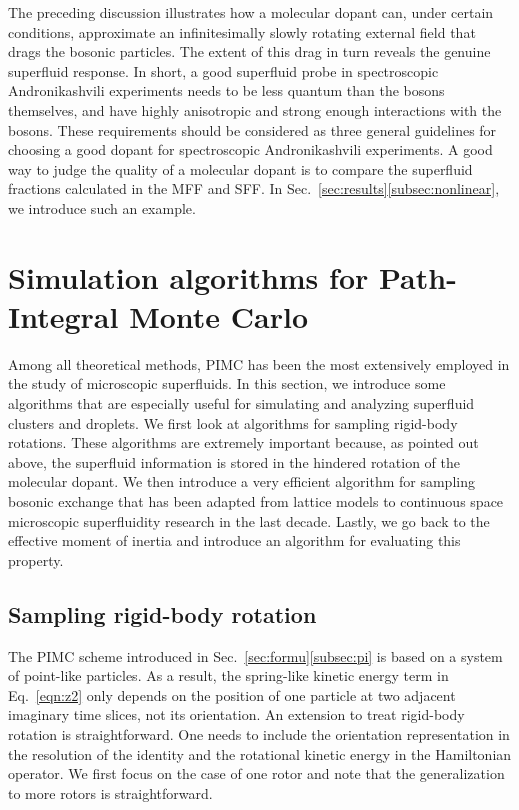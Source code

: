 \documentclass[12pt]{iopart}
\begin{document}
The preceding discussion illustrates how a molecular dopant can, under certain conditions, approximate an infinitesimally slowly rotating external field that drags the bosonic particles. The extent of this drag in turn reveals the genuine superfluid response.
In short, a good superfluid probe in spectroscopic Andronikashvili experiments needs to be less quantum than the bosons themselves, and have highly anisotropic and strong enough interactions with the bosons. 
These requirements should be considered as three general guidelines for choosing a good dopant for spectroscopic Andronikashvili experiments. 
A good way to judge the quality of a molecular dopant is to compare the superfluid fractions calculated in the MFF and SFF. In Sec.~\ref{sec:results}\ref{subsec:nonlinear}, we introduce such an example.

\section{Simulation algorithms for Path-Integral Monte Carlo} \label{sec:algor}

Among all theoretical methods, PIMC has been the most extensively employed in the study of microscopic superfluids. 
In this section, we introduce some algorithms that are especially useful for simulating and analyzing superfluid clusters and droplets. 
We first look at algorithms for sampling rigid-body rotations. 
These algorithms are extremely important because, as pointed out above, the superfluid information is stored in the hindered rotation of the molecular dopant. 
We then introduce a very efficient algorithm for sampling bosonic exchange that has been adapted from lattice models to continuous space microscopic superfluidity research in the last decade. 
Lastly, we go back to the effective moment of inertia and introduce an algorithm for evaluating this property.

\subsection{Sampling rigid-body rotation}

The PIMC scheme introduced in Sec.~\ref{sec:formu}\ref{subsec:pi} is based on a system of point-like particles. As a result, the spring-like kinetic energy term in Eq.~\ref{eqn:z2} only depends on the position of one particle at two adjacent imaginary time slices, not its orientation. 
An extension to treat rigid-body rotation is straightforward. 
One needs to include the orientation representation in the resolution of the identity and the rotational kinetic energy in the Hamiltonian operator. 
We first focus on the case of one rotor and note that the generalization to more rotors is straightforward.
\end{document}
